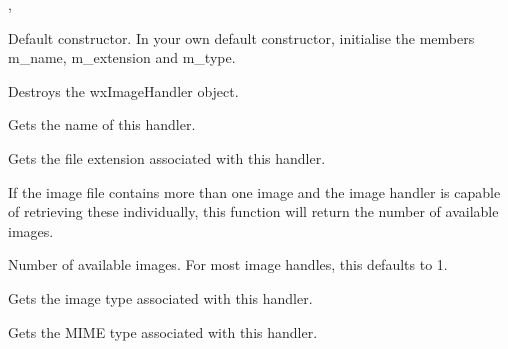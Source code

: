 , 


\label{wximagehandlerconstr}


Default constructor. In your own default constructor, initialise the members
m\_name, m\_extension and m\_type.



Destroys the wxImageHandler object.



Gets the name of this handler.



Gets the file extension associated with this handler.

\label{wximagehandlergetimagecount}


If the image file contains more than one image and the image handler is capable 
of retrieving these individually, this function will return the number of
available images.



Number of available images. For most image handles, this defaults to 1.



Gets the image type associated with this handler.



Gets the MIME type associated with this handler.

\label{wximagehandlerloadfile}

